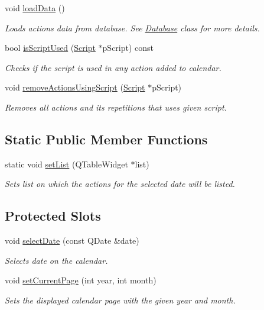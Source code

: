 \begin{DoxyCompactItemize}
void \hyperlink{class_actions_calendar_af47fe81bec606206421e41b74a3a4334}{load\-Data} ()
\begin{DoxyCompactList}\small\item\em Loads actions data from database. See \hyperlink{class_database}{Database} class for more details. \end{DoxyCompactList}\item 
bool \hyperlink{class_actions_calendar_ae875272daa2c6f660143f6376182a118}{is\-Script\-Used} (\hyperlink{class_script}{Script} $\ast$p\-Script) const 
\begin{DoxyCompactList}\small\item\em Checks if the script is used in any action added to calendar. \end{DoxyCompactList}\item 
void \hyperlink{class_actions_calendar_a9ec94acf58dd114aff11dbf287a574e1}{remove\-Actions\-Using\-Script} (\hyperlink{class_script}{Script} $\ast$p\-Script)
\begin{DoxyCompactList}\small\item\em Removes all actions and its repetitions that uses given script. \end{DoxyCompactList}\end{DoxyCompactItemize}
\subsection*{Static Public Member Functions}
\begin{DoxyCompactItemize}
\item 
static void \hyperlink{class_actions_calendar_a7828ecf11d937851cb946d6b9c400936}{set\-List} (Q\-Table\-Widget $\ast$list)
\begin{DoxyCompactList}\small\item\em Sets list on which the actions for the selected date will be listed. \end{DoxyCompactList}\end{DoxyCompactItemize}
\subsection*{Protected Slots}
\begin{DoxyCompactItemize}
\item 
void \hyperlink{class_actions_calendar_a83e6d5f61b80baa0f2ec87d510dc95ba}{select\-Date} (const Q\-Date \&date)
\begin{DoxyCompactList}\small\item\em Selects date on the calendar. \end{DoxyCompactList}\item 
void \hyperlink{class_actions_calendar_a7d3ca15f64dc55a9f41eed685212280b}{set\-Current\-Page} (int year, int month)
\begin{DoxyCompactList}\small\item\em Sets the displayed calendar page with the given year and month. \end{DoxyCompactList}\end{DoxyCompactItemize}
